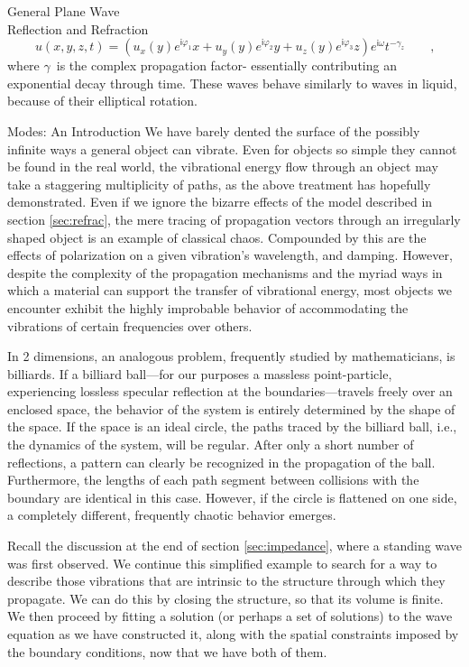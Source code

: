 \documentclass[a4paper,10pt]{report}
\numberwithin{equation}{section}
\begin{document}
{\begin{chapter}
\begin{section}{General Plane Wave \\Reflection and Refraction}
\begin{equation}
u(x,y,z,t) = (u_x(y)e^{\mathsf{i}\varphi_1}x + u_y(y)e^{\mathsf{i}\varphi_2}y + u_z(y)e^{\mathsf{i}\varphi_3}z)e^{\mathsf{i}\omega}t^{-\gamma_z} \qquad \text{,}
\end{equation}
where $\gamma$\  is the complex propagation factor- essentially contributing an exponential decay through time. \cite[p.112]{Kino1987} These waves behave similarly to waves in liquid, because of their elliptical rotation.
\end{section}
\begin{section}{Modes: An Introduction}
 We have barely dented the surface of the possibly infinite ways a general object can vibrate. Even for objects so simple they cannot be found in the real world, the vibrational energy flow through an object may take a staggering multiplicity of paths, as the above treatment has hopefully demonstrated. Even if we ignore the bizarre effects of the model described in section \ref{sec:refrac}, the mere tracing of propagation vectors through an irregularly shaped object is an example of classical chaos. Compounded by this are the effects of polarization on a given vibration's wavelength, and damping. However, despite the complexity of the propagation mechanisms and the myriad ways in which a material can support the transfer of vibrational energy, most objects we encounter exhibit the highly improbable behavior of accommodating the vibrations of certain frequencies over others. 
\par
In 2 dimensions, an analogous problem, frequently studied by mathematicians, is billiards. If a billiard ball---for our purposes a massless point-particle, experiencing lossless specular reflection at the boundaries---travels freely over an enclosed space, the behavior of the system is entirely determined by the shape of the space. If the space is an ideal circle, the paths traced by the billiard ball, i.e., the dynamics of the system, will be regular. After only a short number of reflections, a pattern can clearly be recognized in the propagation of the ball. Furthermore, the lengths of each path segment between collisions with the boundary are identical in this case. However, if the circle is flattened on one side, a completely different, frequently chaotic behavior emerges. \cite{Backer2007}
\par
Recall the discussion at the end of section \ref{sec:impedance}, where a standing wave was first observed. We continue this simplified example to search for a way to describe those vibrations that are intrinsic to the structure through which they propagate. We can do this by closing the structure, so that its volume is finite. We then proceed by fitting a solution (or perhaps a set of solutions) to the wave equation as we have constructed it, along with the spatial constraints imposed by the boundary conditions, now that we have both of them. 

\end{section}
\end{chapter}}
\end{document}

